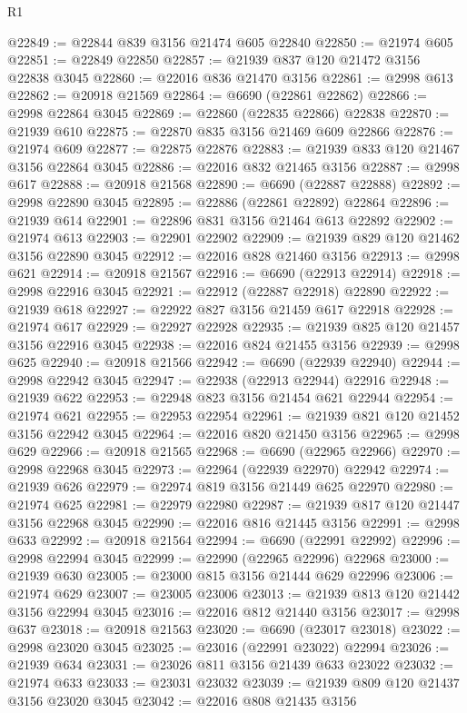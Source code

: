 \begin{lexlean}{R1}
\begin{coremodule}
@22849 := @22844 @839 @3156 @21474 @605 @22840
@22850 := @21974 @605
@22851 := @22849 @22850
@22857 := @21939 @837 @120 @21472 @3156 @22838 @3045
@22860 := @22016 @836 @21470 @3156
@22861 := @2998 @613
@22862 := @20918 @21569
@22864 := @6690 (@22861 @22862)
@22866 := @2998 @22864 @3045
@22869 := @22860 (@22835 @22866) @22838
@22870 := @21939 @610
@22875 := @22870 @835 @3156 @21469 @609 @22866
@22876 := @21974 @609
@22877 := @22875 @22876
@22883 := @21939 @833 @120 @21467 @3156 @22864 @3045
@22886 := @22016 @832 @21465 @3156
@22887 := @2998 @617
@22888 := @20918 @21568
@22890 := @6690 (@22887 @22888)
@22892 := @2998 @22890 @3045
@22895 := @22886 (@22861 @22892) @22864
@22896 := @21939 @614
@22901 := @22896 @831 @3156 @21464 @613 @22892
@22902 := @21974 @613
@22903 := @22901 @22902
@22909 := @21939 @829 @120 @21462 @3156 @22890 @3045
@22912 := @22016 @828 @21460 @3156
@22913 := @2998 @621
@22914 := @20918 @21567
@22916 := @6690 (@22913 @22914)
@22918 := @2998 @22916 @3045
@22921 := @22912 (@22887 @22918) @22890
@22922 := @21939 @618
@22927 := @22922 @827 @3156 @21459 @617 @22918
@22928 := @21974 @617
@22929 := @22927 @22928
@22935 := @21939 @825 @120 @21457 @3156 @22916 @3045
@22938 := @22016 @824 @21455 @3156
@22939 := @2998 @625
@22940 := @20918 @21566
@22942 := @6690 (@22939 @22940)
@22944 := @2998 @22942 @3045
@22947 := @22938 (@22913 @22944) @22916
@22948 := @21939 @622
@22953 := @22948 @823 @3156 @21454 @621 @22944
@22954 := @21974 @621
@22955 := @22953 @22954
@22961 := @21939 @821 @120 @21452 @3156 @22942 @3045
@22964 := @22016 @820 @21450 @3156
@22965 := @2998 @629
@22966 := @20918 @21565
@22968 := @6690 (@22965 @22966)
@22970 := @2998 @22968 @3045
@22973 := @22964 (@22939 @22970) @22942
@22974 := @21939 @626
@22979 := @22974 @819 @3156 @21449 @625 @22970
@22980 := @21974 @625
@22981 := @22979 @22980
@22987 := @21939 @817 @120 @21447 @3156 @22968 @3045
@22990 := @22016 @816 @21445 @3156
@22991 := @2998 @633
@22992 := @20918 @21564
@22994 := @6690 (@22991 @22992)
@22996 := @2998 @22994 @3045
@22999 := @22990 (@22965 @22996) @22968
@23000 := @21939 @630
@23005 := @23000 @815 @3156 @21444 @629 @22996
@23006 := @21974 @629
@23007 := @23005 @23006
@23013 := @21939 @813 @120 @21442 @3156 @22994 @3045
@23016 := @22016 @812 @21440 @3156
@23017 := @2998 @637
@23018 := @20918 @21563
@23020 := @6690 (@23017 @23018)
@23022 := @2998 @23020 @3045
@23025 := @23016 (@22991 @23022) @22994
@23026 := @21939 @634
@23031 := @23026 @811 @3156 @21439 @633 @23022
@23032 := @21974 @633
@23033 := @23031 @23032
@23039 := @21939 @809 @120 @21437 @3156 @23020 @3045
@23042 := @22016 @808 @21435 @3156

\end{coremodule}
\end{lexlean}
